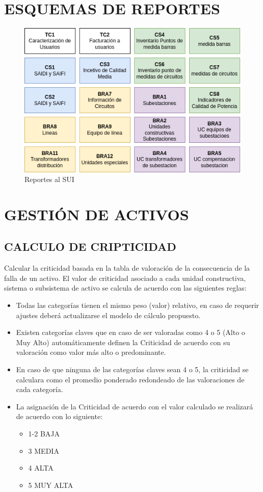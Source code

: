 \documentclass[a5paper]{book}%
\begin{document}
\chapter{ESQUEMAS DE REPORTES}

\begin{figure}[H]
  \centering
  \caption{Reportes al SUI}
  \label{fig:sui}
  \includegraphics[width=\linewidth]{SUI}
\end{figure}

\chapter{GESTIÓN DE ACTIVOS}

\section{CALCULO DE CRIPTICIDAD}
Calcular la criticidad basada en la tabla de valoración de la consecuencia de la falla de un activo. El valor de criticidad asociado a cada unidad constructiva, sistema o subsistema de activo se calcula de acuerdo con las siguientes reglas:

\begin{itemize}
\item Todas las categorías tienen el mismo peso (valor) relativo, en caso de requerir ajustes deberá actualizarse el modelo de cálculo propuesto. 
\item Existen categorías claves que en caso de ser valoradas como 4 o 5 (Alto o Muy Alto) automáticamente definen la Criticidad de acuerdo con su valoración como valor más alto o predominante.
\item En caso de que ninguna de las categorías claves sean 4 o 5, la criticidad se calculara como el promedio ponderado redondeado de las valoraciones de cada categoría.
\item La asignación de la Criticidad de acuerdo con el valor calculado se realizará de acuerdo con lo siguiente:

    \begin{itemize}
    \item 1-2 BAJA
    \item 3 MEDIA
    \item 4 ALTA
    \item 5 MUY ALTA
    \end{itemize}
  \end{itemize}
\end{document}
